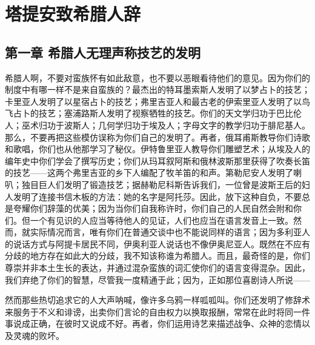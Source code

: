 
\chapter{塔提安致希腊人辞}



\section{第一章 希腊人无理声称技艺的发明}

希腊人啊，不要对蛮族怀有如此敌意，也不要以恶眼看待他们的意见。因为你们的制度中有哪一样不是来自蛮族的？最杰出的特耳墨索斯人发明了以梦占卜的技艺；卡里亚人发明了以星宿占卜的技艺；弗里吉亚人和最古老的伊索里亚人发明了以鸟飞占卜的技艺；塞浦路斯人发明了视察牺牲的技艺。你们的天文学归功于巴比伦人；巫术归功于波斯人；几何学归功于埃及人；字母文字的教学归功于腓尼基人。那么，不要再把这些模仿误称为你们自己的发明了。再者，俄耳甫斯教导你们诗歌和歌唱，你们也从他那学习了秘仪。伊特鲁里亚人教导你们雕塑艺术；从埃及人的编年史中你们学会了撰写历史；你们从玛耳叙阿斯和俄林波斯那里获得了吹奏长笛的技艺——这两个弗里吉亚的乡下人编配了牧羊笛的和声。第勒尼安人发明了喇叭；独目巨人们发明了锻造技艺；据赫勒尼科斯告诉我们，一位曾是波斯王后的妇人发明了连接书信木板的方法：她的名字是阿托莎。因此，放下这种自负，不要总是夸耀你们辞藻的优美；因为当你们自我称许时，你们自己的人民自然会附和你们。但一个有见识的人应当等待他人的见证，人们也应当在语言发音上一致。然而，就实际情况而言，唯有你们在普通交谈中也不能说同样的语言；因为多利亚人的说话方式与阿提卡居民不同，伊奥利亚人说话也不像伊奥尼亚人。既然在不应有分歧的地方存在如此大的分歧，我不知该称谁为希腊人。而且，最奇怪的是，你们尊崇并非本土生长的表达，并通过混杂蛮族的词汇使你们的语言变得混杂。因此，我们弃绝了你们的智慧，尽管我一度精通于此；因为，正如那位喜剧诗人所说——\par

\par

然而那些热切追求它的人大声呐喊，像许多乌鸦一样呱呱叫。你们还发明了修辞术来服务于不义和诽谤，出卖你们言论的自由权力以换取报酬，常常在此时将同一件事说成正确，在彼时又说成不好。再者，你们运用诗艺来描述战争、众神的恋情以及灵魂的败坏。\par

